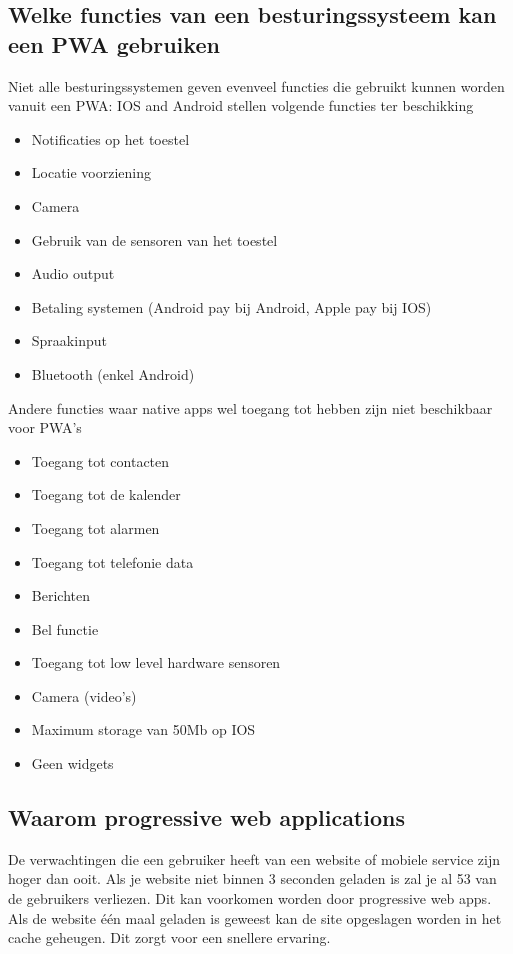 \subsection{Welke functies van een besturingssysteem kan een PWA gebruiken}
Niet alle besturingssystemen geven evenveel functies die gebruikt kunnen worden vanuit een PWA: IOS and Android stellen volgende functies ter beschikking
\begin{itemize}
    \item Notificaties op het toestel
    \item Locatie voorziening
    \item Camera
    \item Gebruik van de sensoren van het toestel
    \item Audio output
    \item Betaling systemen (Android pay bij Android, Apple pay bij IOS)
    \item Spraakinput
    \item Bluetooth (enkel Android)
\end{itemize}
Andere functies waar native apps wel toegang tot hebben zijn niet beschikbaar voor PWA's
\begin{itemize}
    \item Toegang tot contacten
    \item Toegang tot de kalender
    \item Toegang tot alarmen
    \item Toegang tot telefonie data
    \item Berichten
    \item Bel functie
    \item Toegang tot low level hardware sensoren
    \item Camera (video’s)
    \item Maximum storage van 50Mb op IOS
    \item Geen widgets
\end{itemize}

\autocite{Malavolta2016}
\autocite{Destrebecq2018}

\subsection{Waarom progressive web applications}

De verwachtingen die een gebruiker heeft van een website of mobiele service zijn hoger dan ooit. Als je website niet binnen 3 seconden geladen is zal je al 53%
van de gebruikers verliezen. Dit kan voorkomen worden door progressive web apps. Als de website één maal geladen is geweest kan de site opgeslagen worden in het cache geheugen. Dit zorgt voor een snellere ervaring.
\autocite{Google2017}

